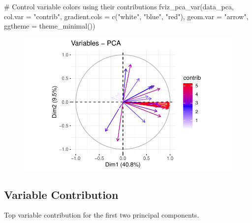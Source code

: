 \documentclass[
  letterpaper,
  DIV=11,
  numbers=noendperiod]{scrreprt}
\newenvironment{Shaded}{\begin{snugshade}}{\end{snugshade}}
\newcommand{\AttributeTok}[1]{\textcolor[rgb]{0.40,0.45,0.13}{#1}}
\newcommand{\CommentTok}[1]{\textcolor[rgb]{0.37,0.37,0.37}{#1}}
\newcommand{\FunctionTok}[1]{\textcolor[rgb]{0.28,0.35,0.67}{#1}}
\newcommand{\NormalTok}[1]{\textcolor[rgb]{0.00,0.23,0.31}{#1}}
\newcommand{\StringTok}[1]{\textcolor[rgb]{0.13,0.47,0.30}{#1}}
\begin{document}
\begin{Shaded}
\begin{Highlighting}[]
\CommentTok{\# Control variable colors using their contributions}
\FunctionTok{fviz\_pca\_var}\NormalTok{(data\_pca, }\AttributeTok{col.var =} \StringTok{"contrib"}\NormalTok{,}
   \AttributeTok{gradient.cols =} \FunctionTok{c}\NormalTok{(}\StringTok{"white"}\NormalTok{, }\StringTok{"blue"}\NormalTok{, }\StringTok{"red"}\NormalTok{),}
   \AttributeTok{geom.var =} \StringTok{"arrow"}\NormalTok{,}
   \AttributeTok{ggtheme =} \FunctionTok{theme\_minimal}\NormalTok{())}
\end{Highlighting}
\end{Shaded}

\begin{figure}[H]

{\centering \includegraphics{analysis_files/figure-pdf/unnamed-chunk-23-1.pdf}

}

\end{figure}

\hypertarget{variable-contribution-1}{%
\subsection{Variable Contribution}\label{variable-contribution-1}}

Top variable contribution for the first two principal components.
\end{document}
